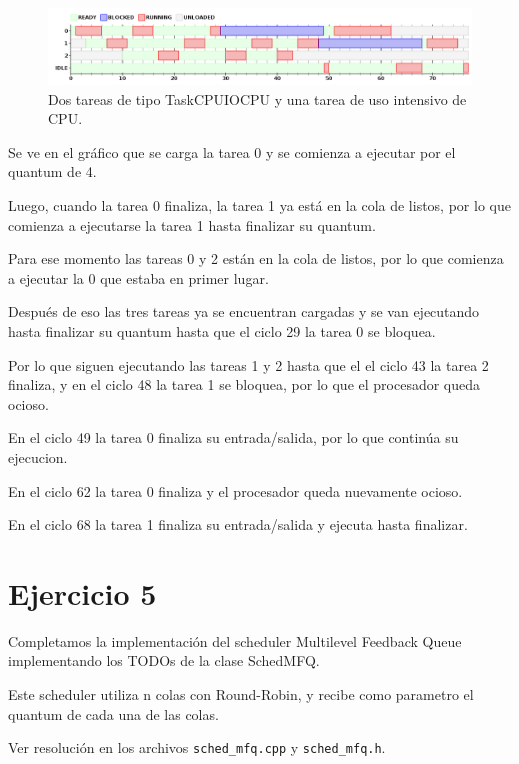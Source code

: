 \begin{figure}[h!]
  \caption{Dos tareas de tipo TaskCPUIOCPU y una tarea de uso intensivo de CPU.}
  \centering
    \includegraphics[width=1\textwidth]{img/ejercicio4_2.png}
\end{figure}

Se ve en el gr\'afico que se carga la tarea 0 y se comienza a ejecutar por el quantum de 4.

Luego, cuando la tarea 0 finaliza, la tarea 1 ya est\'a en la cola de listos, por lo que comienza a ejecutarse la tarea 1 hasta finalizar su quantum.

Para ese momento las tareas 0 y 2 est\'an en la cola de listos, por lo que comienza a ejecutar la 0 que estaba en primer lugar.

Despu\'es de eso las tres tareas ya se encuentran cargadas y se van ejecutando hasta finalizar su quantum hasta que el ciclo 29 la tarea 0 se bloquea.

Por lo que siguen ejecutando las tareas 1 y 2 hasta que el el ciclo 43 la tarea 2 finaliza, y en el ciclo 48 la tarea 1 se bloquea, por lo que el procesador queda ocioso.

En el ciclo 49 la tarea 0 finaliza su entrada/salida, por lo que contin\'ua su ejecucion. 

En el ciclo 62 la tarea 0 finaliza y el procesador queda nuevamente ocioso.

En el ciclo 68 la tarea 1 finaliza su entrada/salida y ejecuta hasta finalizar.


\section{Ejercicio 5}

Completamos la implementaci\'on del scheduler Multilevel Feedback Queue implementando los TODOs de la clase SchedMFQ.

Este scheduler utiliza n colas con Round-Robin, y recibe como parametro el quantum de cada una de las colas.

Ver resoluci\'on en los archivos \verb|sched_mfq.cpp| y \verb|sched_mfq.h|.

